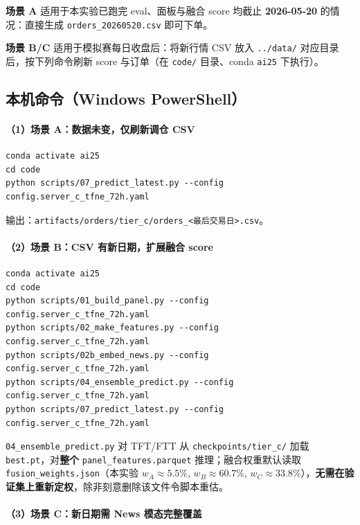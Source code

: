 \documentclass[UTF8,a4paper,12pt]{ctexart}
\begin{document}
\textbf{场景 A} 适用于本实验已跑完 eval、面板与融合 score 均截止 \textbf{2026-05-20} 的情况：直接生成 \texttt{orders\_20260520.csv} 即可下单。

\textbf{场景 B/C} 适用于模拟赛每日收盘后：将新行情 CSV 放入 \texttt{../data/} 对应目录后，按下列命令刷新 score 与订单（在 \texttt{code/} 目录、conda \texttt{ai25} 下执行）。

\subsection{本机命令（Windows PowerShell）}

\paragraph{（1）场景 A：数据未变，仅刷新调仓 CSV}

\begin{verbatim}
conda activate ai25
cd code
python scripts/07_predict_latest.py --config config.server_c_tfne_72h.yaml
\end{verbatim}

输出：\texttt{artifacts/orders/tier\_c/orders\_<最后交易日>.csv}。

\paragraph{（2）场景 B：CSV 有新日期，扩展融合 score}

\begin{verbatim}
conda activate ai25
cd code
python scripts/01_build_panel.py --config config.server_c_tfne_72h.yaml
python scripts/02_make_features.py --config config.server_c_tfne_72h.yaml
python scripts/02b_embed_news.py --config config.server_c_tfne_72h.yaml
python scripts/04_ensemble_predict.py --config config.server_c_tfne_72h.yaml
python scripts/07_predict_latest.py --config config.server_c_tfne_72h.yaml
\end{verbatim}

\texttt{04\_ensemble\_predict.py} 对 TFT/FTT 从 \texttt{checkpoints/tier\_c/} 加载 \texttt{best.pt}，对\textbf{整个} \texttt{panel\_features.parquet} 推理；融合权重默认读取 \texttt{fusion\_weights.json}（本实验 $w_A\!\approx\!5.5\%$, $w_B\!\approx\!60.7\%$, $w_C\!\approx\!33.8\%$），\textbf{无需在验证集上重新定权}，除非刻意删除该文件令脚本重估。

\paragraph{（3）场景 C：新日期需 News 模态完整覆盖}
\end{document}
